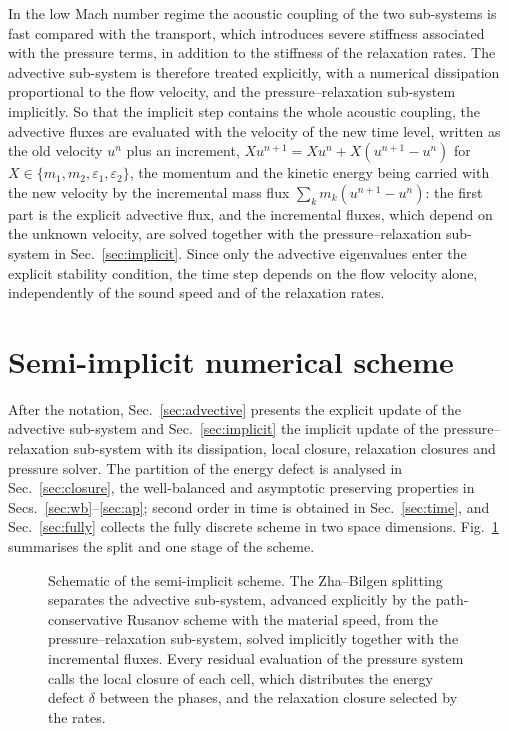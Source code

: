 In the low Mach number regime the acoustic coupling of the two sub-systems is fast compared with the transport, which
introduces severe stiffness associated with the pressure terms, in addition to the stiffness of the relaxation rates.
The advective sub-system is therefore treated explicitly, with a numerical dissipation proportional to the flow velocity,
and the pressure--relaxation sub-system implicitly. So that the implicit step contains the whole acoustic coupling,
the advective fluxes are evaluated with the velocity of the new time level, written as the old velocity $u^n$ plus an
increment, $Xu^{n+1}=Xu^n+X(u^{n+1}-u^n)$ for $X\in\{m_1,m_2,\varepsilon_1,\varepsilon_2\}$, the momentum and the kinetic
energy being carried with the new velocity by the incremental mass flux $\sum_km_k(u^{n+1}-u^n)$: the first part is the
explicit advective flux, and the incremental fluxes, which depend on the unknown velocity, are solved together with the
pressure--relaxation sub-system in Sec.~\ref{sec:implicit}. Since only the advective eigenvalues enter the explicit stability condition, the time
step depends on the flow velocity alone, independently of the sound speed and of the relaxation rates.

\section{Semi-implicit numerical scheme}
\label{sec:method}

After the notation, Sec.~\ref{sec:advective} presents the explicit update of the
advective sub-system and Sec.~\ref{sec:implicit} the implicit update of the pressure--relaxation sub-system with its
dissipation, local closure, relaxation closures and pressure solver. The partition of the energy defect is analysed in
Sec.~\ref{sec:closure}, the well-balanced and asymptotic preserving properties in Secs.~\ref{sec:wb}--\ref{sec:ap}; second order in time is obtained in Sec.~\ref{sec:time}, and
Sec.~\ref{sec:fully} collects the fully discrete scheme in two space dimensions.
Fig.~\ref{fig:scheme} summarises the split and one stage of the scheme.

\begin{figure}[p]
\centering
\resizebox*{!}{0.84\textheight}{}
\caption{Schematic of the semi-implicit scheme. The Zha--Bilgen splitting separates the advective
sub-system, advanced explicitly by the path-conservative Rusanov scheme with the material speed, from the
pressure--relaxation sub-system, solved implicitly together with the incremental fluxes. Every residual evaluation of the pressure system calls the local closure of each cell, which
distributes the energy defect $\delta$ between the phases, and the relaxation closure selected by the rates.}
\label{fig:scheme}
\end{figure}

